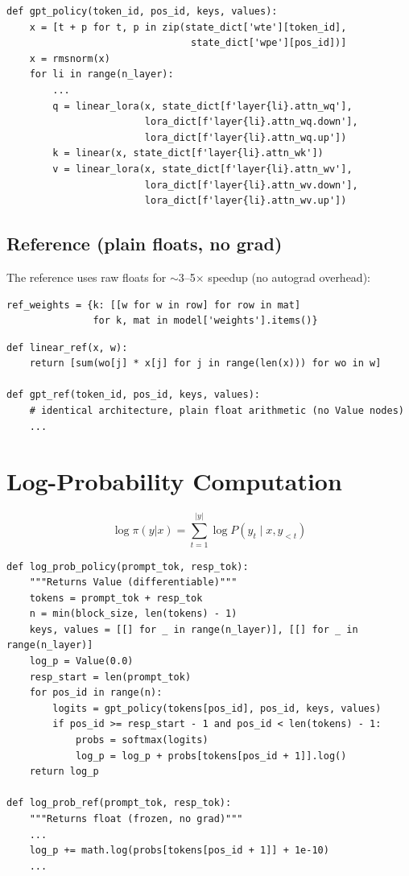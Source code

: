\documentclass[11pt,a4paper]{article}
\begin{document}
\begin{lstlisting}[firstnumber=154]
def gpt_policy(token_id, pos_id, keys, values):
    x = [t + p for t, p in zip(state_dict['wte'][token_id],
                                state_dict['wpe'][pos_id])]
    x = rmsnorm(x)
    for li in range(n_layer):
        ...
        q = linear_lora(x, state_dict[f'layer{li}.attn_wq'],
                        lora_dict[f'layer{li}.attn_wq.down'],
                        lora_dict[f'layer{li}.attn_wq.up'])
        k = linear(x, state_dict[f'layer{li}.attn_wk'])
        v = linear_lora(x, state_dict[f'layer{li}.attn_wv'],
                        lora_dict[f'layer{li}.attn_wv.down'],
                        lora_dict[f'layer{li}.attn_wv.up'])
\end{lstlisting}

\subsection{Reference (plain floats, no grad)}

The reference uses raw floats for $\sim$3--5$\times$ speedup (no autograd overhead):

\begin{lstlisting}[firstnumber=116]
ref_weights = {k: [[w for w in row] for row in mat]
               for k, mat in model['weights'].items()}
\end{lstlisting}

\begin{lstlisting}[firstnumber=186]
def linear_ref(x, w):
    return [sum(wo[j] * x[j] for j in range(len(x))) for wo in w]

def gpt_ref(token_id, pos_id, keys, values):
    # identical architecture, plain float arithmetic (no Value nodes)
    ...
\end{lstlisting}

\section{Log-Probability Computation}

\[
\log \pi(y|x) = \sum_{t=1}^{|y|} \log P(y_t \mid x, y_{<t})
\]

\begin{lstlisting}[firstnumber=231]
def log_prob_policy(prompt_tok, resp_tok):
    """Returns Value (differentiable)"""
    tokens = prompt_tok + resp_tok
    n = min(block_size, len(tokens) - 1)
    keys, values = [[] for _ in range(n_layer)], [[] for _ in range(n_layer)]
    log_p = Value(0.0)
    resp_start = len(prompt_tok)
    for pos_id in range(n):
        logits = gpt_policy(tokens[pos_id], pos_id, keys, values)
        if pos_id >= resp_start - 1 and pos_id < len(tokens) - 1:
            probs = softmax(logits)
            log_p = log_p + probs[tokens[pos_id + 1]].log()
    return log_p

def log_prob_ref(prompt_tok, resp_tok):
    """Returns float (frozen, no grad)"""
    ...
    log_p += math.log(probs[tokens[pos_id + 1]] + 1e-10)
    ...
\end{lstlisting}
\end{document}
